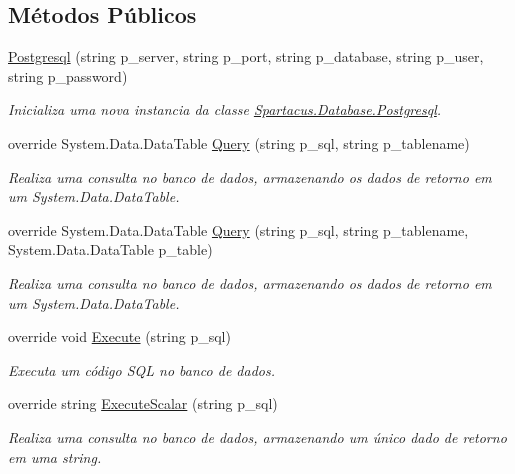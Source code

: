 \subsection*{Métodos Públicos}
\begin{DoxyCompactItemize}
\item 
\hyperlink{classSpartacus_1_1Database_1_1Postgresql_aa31cf4130a7a47488de77d9c8152c90c}{Postgresql} (string p\+\_\+server, string p\+\_\+port, string p\+\_\+database, string p\+\_\+user, string p\+\_\+password)
\begin{DoxyCompactList}\small\item\em Inicializa uma nova instancia da classe \hyperlink{classSpartacus_1_1Database_1_1Postgresql}{Spartacus.\+Database.\+Postgresql}. \end{DoxyCompactList}\item 
override System.\+Data.\+Data\+Table \hyperlink{classSpartacus_1_1Database_1_1Postgresql_a4a60b1e3851bb0b9bec5ad3d8b6bdc4e}{Query} (string p\+\_\+sql, string p\+\_\+tablename)
\begin{DoxyCompactList}\small\item\em Realiza uma consulta no banco de dados, armazenando os dados de retorno em um System.\+Data.\+Data\+Table. \end{DoxyCompactList}\item 
override System.\+Data.\+Data\+Table \hyperlink{classSpartacus_1_1Database_1_1Postgresql_ad14dbb0c81571d02b368388d8a8ebd97}{Query} (string p\+\_\+sql, string p\+\_\+tablename, System.\+Data.\+Data\+Table p\+\_\+table)
\begin{DoxyCompactList}\small\item\em Realiza uma consulta no banco de dados, armazenando os dados de retorno em um System.\+Data.\+Data\+Table. \end{DoxyCompactList}\item 
override void \hyperlink{classSpartacus_1_1Database_1_1Postgresql_a30357f4e3fc07945f58f9bdad4843460}{Execute} (string p\+\_\+sql)
\begin{DoxyCompactList}\small\item\em Executa um código S\+Q\+L no banco de dados. \end{DoxyCompactList}\item 
override string \hyperlink{classSpartacus_1_1Database_1_1Postgresql_a4c0c196e35ba1253d5b5783c26c93d08}{Execute\+Scalar} (string p\+\_\+sql)
\begin{DoxyCompactList}\small\item\em Realiza uma consulta no banco de dados, armazenando um único dado de retorno em uma string. \end{DoxyCompactList}\end{DoxyCompactItemize}

